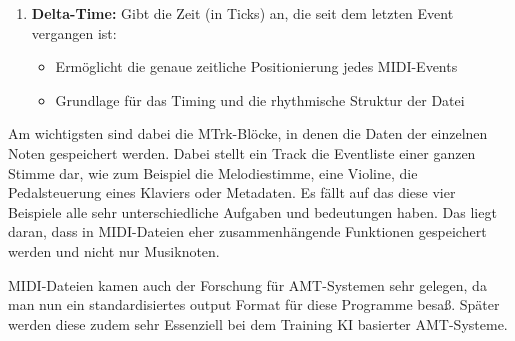 \begin{enumerate}
    \item \textbf{Delta-Time:} Gibt die Zeit (in Ticks) an, die seit dem letzten Event vergangen ist:
    \begin{itemize}
        \item Ermöglicht die genaue zeitliche Positionierung jedes MIDI-Events
        \item Grundlage für das Timing und die rhythmische Struktur der Datei
    \end{itemize}
\end{enumerate}
Am wichtigsten sind dabei die MTrk-Blöcke, in denen die Daten der einzelnen Noten gespeichert werden.
Dabei stellt ein Track die Eventliste einer ganzen Stimme dar,
wie zum Beispiel die Melodiestimme, eine Violine, die Pedalsteuerung eines Klaviers oder Metadaten.
Es fällt auf das diese vier Beispiele alle sehr unterschiedliche Aufgaben und bedeutungen haben.
Das liegt daran, dass in MIDI-Dateien eher zusammenhängende Funktionen gespeichert werden und nicht nur Musiknoten.

MIDI-Dateien kamen auch der Forschung für AMT-Systemen sehr gelegen,
da man nun ein standardisiertes output Format für diese Programme besaß.
Später werden diese zudem sehr Essenziell bei dem Training KI basierter AMT-Systeme.
\cite{telila2025cnn}

